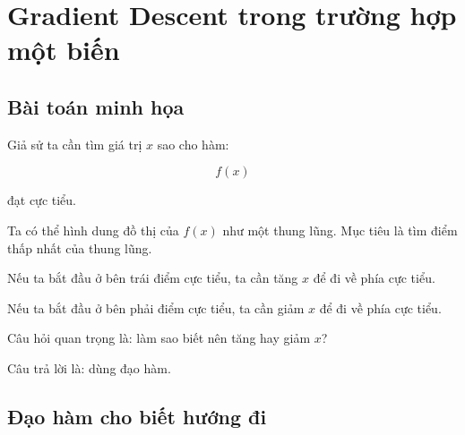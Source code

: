 \documentclass[12pt,a4paper]{report}
\begin{document}
\chapter{Gradient Descent trong trường hợp một biến}

\section{Bài toán minh họa}

Giả sử ta cần tìm giá trị $x$ sao cho hàm:

\[
    f(x)
\]

đạt cực tiểu.

Ta có thể hình dung đồ thị của $f(x)$ như một thung lũng. Mục tiêu là tìm điểm thấp nhất của thung lũng.

\begin{center}
\end{center}

Nếu ta bắt đầu ở bên trái điểm cực tiểu, ta cần tăng $x$ để đi về phía cực tiểu.

Nếu ta bắt đầu ở bên phải điểm cực tiểu, ta cần giảm $x$ để đi về phía cực tiểu.

Câu hỏi quan trọng là: làm sao biết nên tăng hay giảm $x$?

Câu trả lời là: dùng đạo hàm.

\section{Đạo hàm cho biết hướng đi}
\end{document}
